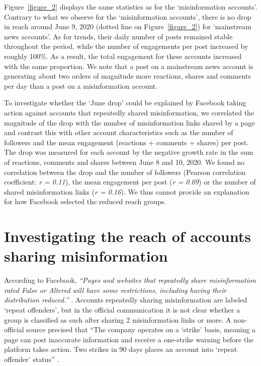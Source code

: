 \documentclass[sigconf]{acmart}
\begin{document}
Figure~\ref{figure_2} displays the same statistics as for the `misinformation accounts'. Contrary to what we observe for the `misinformation accounts', there is no drop in reach around June 9, 2020 (dotted line on Figure~\ref{figure_2}) for `mainstream news accounts'. As for trends, their daily number of posts remained stable throughout the period, while the number of  engagements per post increased by roughly 100\%. As a result, the total engagement for these accounts increased with the same proportion. We note that a post on a mainstream news account is generating about two orders of magnitude more reactions, shares and comments per day than a post on a misinformation account.

To investigate whether the `June drop' could be explained by Facebook taking action against accounts that repeatedly shared misinformation, we correlated the magnitude of the drop with the number of misinformation links shared by a page and contrast this with other account characteristics such as the number of followers and the mean engagement (reactions + comments + shares) per post. The drop was measured for each account by the negative growth rate in the sum of reactions, comments and shares between June 8 and 10, 2020. We found no correlation between the drop and the number of followers (Pearson correlation coefficient: \textit{r = 0.11}), the mean engagement per post (\textit{r = 0.09}) or the number of shared misinformation links (\textit{r = 0.16}). We thus cannot provide an explanation for how  Facebook selected the reduced reach groups.

\section{Investigating the reach of accounts sharing misinformation}

According to Facebook, \textit{``Pages and websites that repeatedly share misinformation rated False or Altered will have some restrictions, including having their distribution reduced.''} \cite{FacebookMeasuresAgainstMisinformation}. Accounts repeatedly sharing misinformation are labeled `repeat offenders', but in the official communication it is not clear whether a group is classified as such after sharing 2 misinformation links or more. A non-official source precised that ``The company operates on a `strike' basis, meaning a page can post inaccurate information and receive a one-strike warning before the platform takes action. Two strikes in 90 days places an account into `repeat offender' status'' \cite{NBCnewsMeasuresAgainstMisinformation}.
\end{document}
